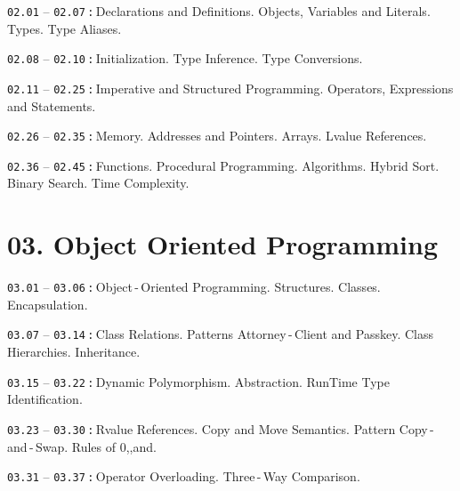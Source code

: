 \documentclass[a4paper,12pt]{article}
\renewenvironment{itemize}
{
    \begin{list}{\labelitemi}
    {
      \setlength{\topsep}{0pt}
      \setlength{\partopsep}{0pt}
      \setlength{\parskip}{0pt}
      \setlength{\itemsep}{0pt}
      \setlength{\parsep}{0pt}
      \setlength{\leftmargin}{14.5pt}
    }
}{\end{list}}
\begin{document}
\begin{itemize}

    \item \texttt{02.01} -- \texttt{02.07}\,\texttt{:}\,Declarations and Definitions. Objects, Variables and Literals. Types. Type Aliases.

    \smallskip

    \item \texttt{02.08} -- \texttt{02.10}\,\texttt{:}\,Initialization. Type Inference. Type Conversions.

    \smallskip

    \item \texttt{02.11} -- \texttt{02.25}\,\texttt{:}\,Imperative and Structured Programming. Operators, Expressions and Statements.

    \smallskip

    \item \texttt{02.26} -- \texttt{02.35}\,\texttt{:}\,Memory. Addresses and Pointers. Arrays. Lvalue References.

    \smallskip

    \item \texttt{02.36} -- \texttt{02.45}\,\texttt{:}\,Functions. Procedural Programming. Algorithms. Hybrid Sort. Binary Search. Time Complexity.
    
\end{itemize}

\section{03. Object Oriented Programming}

\begin{itemize}

    \item \texttt{03.01} -- \texttt{03.06}\,\texttt{:}\,Object\,-\,Oriented Programming. Structures. Classes. Encapsulation. 

    \smallskip

    \item \texttt{03.07} -- \texttt{03.14}\,\texttt{:}\,Class Relations. Patterns Attorney\,-\,Client and Passkey. Class Hierarchies. Inheritance.

    \smallskip

    \item \texttt{03.15} -- \texttt{03.22}\,\texttt{:}\,Dynamic Polymorphism. Abstraction. RunTime Type Identification.

    \smallskip

    \item \texttt{03.23} -- \texttt{03.30}\,\texttt{:}\,Rvalue References. Copy and Move Semantics. Pattern Copy\,-\,and\,-\,Swap. Rules of 0,,\:and.

    \smallskip

    \item \texttt{03.31} -- \texttt{03.37}\,\texttt{:}\,Operator Overloading. Three\,-\,Way Comparison.
    
\end{itemize}
\end{document}
